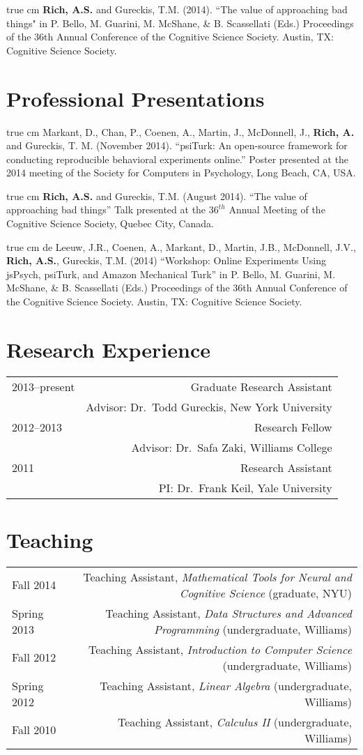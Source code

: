 \documentclass[12pt]{my_cv}
\def\ind{\hangindent=1 true cm\hangafter=1 \noindent}
\begin{document}
\ind \textbf{Rich, A.S.} and Gureckis, T.M. (2014). ``The value of approaching bad things" in P. Bello, M. Guarini, M. McShane, \& B. Scassellati (Eds.) Proceedings of the 36th Annual Conference of the Cognitive Science Society. Austin, TX: Cognitive Science Society.	

\section{Professional Presentations}
\ind Markant, D., Chan, P., Coenen, A., Martin, J., McDonnell, J., \textbf{Rich, A.} and Gureckis, T. M. (November 2014). ``psiTurk: An open-source framework for conducting reproducible behavioral experiments online.'' Poster presented at the 2014 meeting of the Society for Computers in Psychology, Long Beach, CA, USA.

\ind \textbf{Rich, A.S.} and Gureckis, T.M. (August 2014). ``The value of approaching bad things'' Talk presented at the $36^{th}$ Annual Meeting of the Cognitive Science Society, Quebec City, Canada.

\ind de Leeuw, J.R., Coenen, A., Markant, D., Martin, J.B., McDonnell, J.V., \textbf{Rich, A.S.}, Gureckis, T.M. (2014) ``Workshop: Online Experiments Using jsPsych, psiTurk, and Amazon Mechanical Turk'' in P. Bello, M. Guarini, M. McShane, \& B. Scassellati (Eds.) Proceedings of the 36th Annual Conference of the Cognitive Science Society. Austin, TX: Cognitive Science Society.	

\section{Research Experience}
\begin{tabular}{L R}
2013--present& Graduate Research Assistant\\
&Advisor: Dr.\ Todd Gureckis, New York University\\[1ex]
2012--2013& Research Fellow\\
&Advisor: Dr.\ Safa Zaki, Williams College\\[1ex]
2011&Research Assistant\\
&PI: Dr.\ Frank Keil, Yale University\\
\end{tabular}

\section{Teaching}
\begin{tabular}{L R}
Fall 2014&Teaching Assistant, \emph{Mathematical Tools for Neural and Cognitive Science} (graduate, NYU)\\ [0.5ex]
Spring 2013&Teaching Assistant, \emph{Data Structures and Advanced Programming} (undergraduate, Williams)\\[0.5ex]
Fall 2012&Teaching Assistant, \emph{Introduction to Computer Science} (undergraduate, Williams)\\[0.5ex]
Spring 2012&Teaching Assistant, \emph{Linear Algebra} (undergraduate, Williams)\\[0.5ex]
Fall 2010&Teaching Assistant, \emph{Calculus II} (undergraduate, Williams)\\[0.5ex]
\end{tabular}
\end{document}
